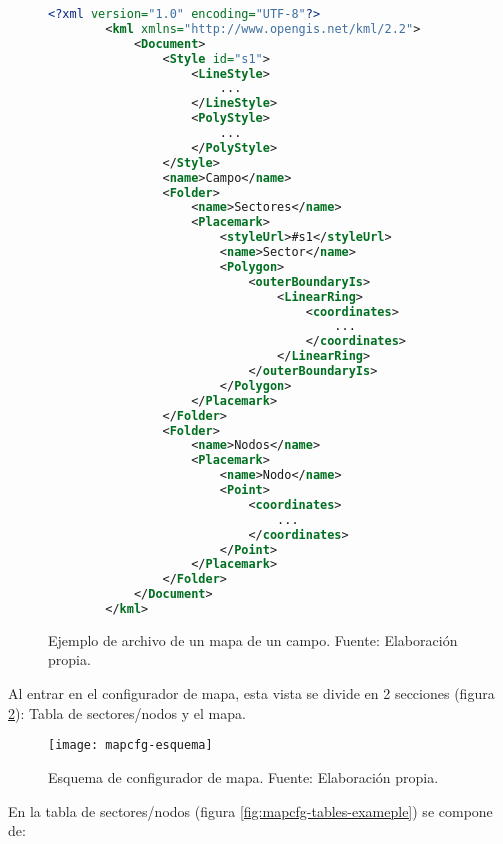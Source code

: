 \begin{figure}[H]
    \centering
    \begin{lstlisting}[language=XML, frame=single]
    <?xml version="1.0" encoding="UTF-8"?>
        <kml xmlns="http://www.opengis.net/kml/2.2">
            <Document>
                <Style id="s1">
                    <LineStyle>
                        ...
                    </LineStyle>
                    <PolyStyle>
                        ...
                    </PolyStyle>
                </Style>
                <name>Campo</name>
                <Folder>
                    <name>Sectores</name>                        
                    <Placemark>
                        <styleUrl>#s1</styleUrl>
                        <name>Sector</name>
                        <Polygon>
                            <outerBoundaryIs>
                                <LinearRing>
                                    <coordinates>
                                        ...
                                    </coordinates>
                                </LinearRing>
                            </outerBoundaryIs>
                        </Polygon>
                    </Placemark>
                </Folder>
                <Folder>
                    <name>Nodos</name>
                    <Placemark>
                        <name>Nodo</name>
                        <Point>
                            <coordinates>
                                ...
                            </coordinates>
                        </Point>
                    </Placemark>                        
                </Folder>
            </Document>
        </kml>
    \end{lstlisting}
    \caption{Ejemplo de archivo de un mapa de un campo. Fuente: Elaboración propia.}
    \label{fig:ejemplo_export}
\end{figure}

Al entrar en el configurador de mapa, esta vista se divide en 2 secciones (figura \ref{fig:mapcfg-esquema}): Tabla de sectores/nodos y el mapa.
\begin{figure}[H]
	\centering
	\texttt{[image: mapcfg-esquema]}
	\caption{\label{fig:mapcfg-esquema} Esquema de configurador de mapa. Fuente: Elaboración propia.}
\end{figure}

En la tabla de sectores/nodos (figura \ref{fig:mapcfg-tables-exameple}) se compone de:

